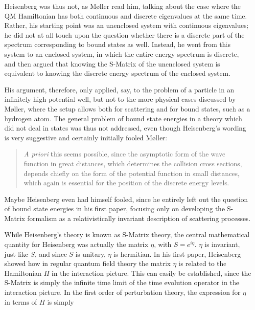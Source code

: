 \documentclass[12pt]{article}
\begin{document}
Heisenberg was thus not, as M\o ller read him, talking about the case where the QM Hamiltonian has both continuous and discrete eigenvalues at the same time. Rather, his starting point was an unenclosed system with continuous eigenvalues; he did not at all touch upon the question whether there is a discrete part of the spectrum corresponding to bound states as well. Instead, he went from this system to an enclosed system, in which the entire energy spectrum is discrete, and then argued that knowing the S-Matrix of the unenclosed system is equivalent to knowing the discrete energy spectrum of the enclosed system.

His argument, therefore, only applied, say, to the problem of a particle in an infinitely high potential well, but not to the more physical cases discussed by M\o ller, where the setup allows both for scattering and for bound states, such as a hydrogen atom. The general problem of bound state energies in a theory which did not deal in states was thus not addressed, even though Heisenberg's wording is very suggestive and certainly initially fooled M\o ller:

\begin{quote}
\emph{A priori} this seems possible, since the asymptotic form of the wave function in great distances, which determines the collision cross sections, depends chiefly on the form of the potential function in small distances, which again is essential for the position of the discrete energy levels. \citep[p.18]{moller_1945_general}
\end{quote}

Maybe Heisenberg even had himself fooled, since he entirely left out the question of bound state energies in his first paper, focusing only on developing the S-Matrix formalism as a relativistically invariant description of scattering processes.

While Heisenberg's theory is known as S-Matrix theory, the central mathematical quantity for Heisenberg was actually the matrix $\eta$, with $S = e^{i \eta}$. $\eta$ is invariant, just like $S$, and since $S$ is unitary, $\eta$ is hermitian. In his first paper, Heisenberg showed how in regular quantum field theory the matrix $\eta$ is related to the Hamiltonian $H$ in the interaction picture. This can easily be established, since the S-Matrix is simply the infinite time limit of the time evolution operator in the interaction picture. In the first order of perturbation theory, the expression for $\eta$ in terms of $H$ is simply
\end{document}
